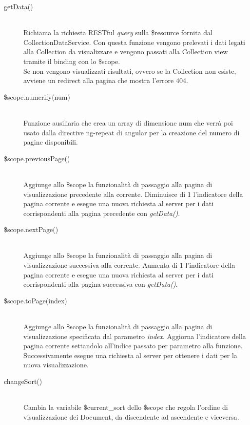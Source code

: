 \begin{description}
\begin{description}
  \item[getData()] \hfill \\
  Richiama la richiesta RESTful \textit{query} sulla \$resource fornita dal CollectionDataService.
  Con questa funzione vengono prelevati i dati legati alla Collection da visualizzare e vengono
  passati alla Collection view tramite il binding con lo \$scope. \\
  Se non vengono visualizzati risultati, ovvero se la Collection non esiste, avviene un redirect alla pagina
  che mostra l'errore 404.
  
  \item[\$scope.numerify(num)] \hfill \\
  Funzione ausiliaria che crea un array di dimensione   {num} che verrà poi usato dalla directive   {ng-repeat} di angular per la creazione 
  del numero di 
  pagine disponibili.
  
  \item[\$scope.previousPage()] \hfill \\
  Aggiunge allo \$scope la funzionalità di passaggio alla pagina di visualizzazione precedente alla corrente.
  Diminuisce di 1 l'indicatore della pagina corrente e esegue una nuova richiesta al server per i dati corrispondenti
  alla pagina precedente con \emph{getData()}.
  
  \item[\$scope.nextPage()] \hfill \\
  Aggiunge allo \$scope la funzionalità di passaggio alla pagina di visualizzazione successiva alla corrente.
  Aumenta di 1 l'indicatore della pagina corrente e esegue una nuova richiesta al server per i dati corrispondenti
  alla pagina successiva con \emph{getData()}.
  
  \item[\$scope.toPage(index)] \hfill \\
  Aggiunge allo \$scope la funzionalità di passaggio alla pagina di visualizzazione specificata dal parametro \emph{index}.
  Aggiorna l'indicatore della pagina corrente settandolo all'indice passato per parametro alla funzione.
  Successivamente esegue una richiesta al server per ottenere i dati per la nuova visualizzazione.
  
  \item[changeSort()] \hfill \\
  Cambia la variabile \$current\_sort dello \$scope che regola l'ordine di visualizzazione dei Document, da discendente ad
  ascendente e viceversa.
  

\end{description}
\end{description}
